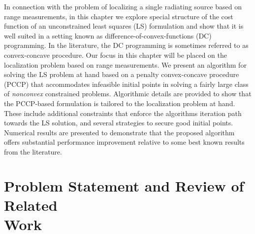 \label{chapter:pccp}


%
%
%
%
%
%
%


In connection with the problem of localizing a single radiating source based on range measurements, in this chapter we explore special structure of the cost function of an unconstrained least squares (LS) formulation and show that it is well suited in a setting known as difference-of-convex-functions (DC) programming. In the literature, the DC programming is sometimes referred to as convex-concave procedure. Our focus in this chapter will be placed on the localization problem based on range measurements. We present an algorithm for solving the LS problem at hand based on a penalty convex-concave procedure (PCCP) \cite{LBoyd} that accommodates infeasible initial points in solving a fairly large class of \textit{nonconvex} constrained problems. Algorithmic details are provided to show that the PCCP-based formulation is tailored to the localization problem at hand. These include additional constraints that enforce the algorithms iteration path towards the LS solution, and several strategies to secure good initial points. Numerical results are presented to demonstrate that the proposed algorithm
offers substantial performance improvement relative to some best known results from the literature.


\section{Problem Statement and Review of Related\\ Work}%


